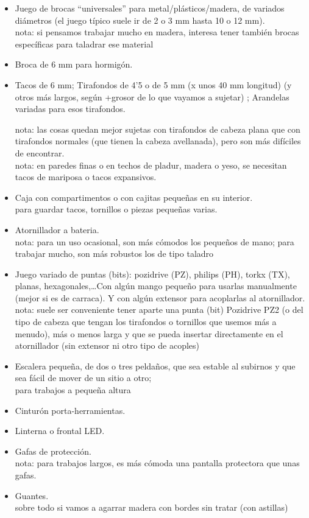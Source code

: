 \documentclass[spanish,10pt,a4paper,final,oneside]{article}
\begin{document}
\begin{itemize}
\item Juego de brocas ``universales'' para metal/plásticos/madera, de variados diámetros (el juego típico suele ir de 2 o 3 mm hasta 10 o 12 mm).
\\nota: si pensamos trabajar mucho en madera, interesa tener también brocas específicas para taladrar ese material

\item Broca de 6 mm para hormigón.

\item Tacos de 6 mm; Tirafondos de 4'5 o de 5 mm (x unos 40 mm longitud) (y otros más largos, según +grosor de lo que vayamos a sujetar) ; Arandelas variadas para esos tirafondos.

nota: las cosas quedan mejor sujetas con tirafondos de cabeza plana que con tirafondos normales (que tienen la cabeza avellanada), pero son más difíciles de encontrar.
\\nota: en paredes finas o en techos de pladur, madera o yeso, se necesitan tacos de mariposa o tacos expansivos.

\item Caja con compartimentos o con cajitas pequeñas en su interior.
\\para guardar tacos, tornillos o piezas pequeñas varias.

\item Atornillador a bateria.
\\nota: para un uso ocasional, son más cómodos los pequeños de mano; para trabajar mucho, son más robustos los de tipo taladro

\item Juego variado de puntas (bits): pozidrive (PZ), philips (PH), torkx (TX), planas, hexagonales,\ldots Con algún mango pequeño para usarlas manualmente (mejor si es de carraca). Y con algún extensor para acoplarlas al atornillador.
\\nota: suele ser conveniente tener aparte una punta (bit) Pozidrive PZ2 (o del tipo de cabeza que tengan los tirafondos o tornillos que usemos más a menudo), más o menos larga y que se pueda insertar directamente en el atornillador (sin extensor ni otro tipo de acoples)

\item Escalera pequeña, de dos o tres peldaños, que sea estable al subirnos y que sea fácil de mover de un sitio a otro;
\\para trabajos a pequeña altura

\item Cinturón porta-herramientas.

\item Linterna o frontal LED.

\item Gafas de protección.
\\nota: para trabajos largos, es más cómoda una pantalla protectora que unas gafas.

\item Guantes.
\\sobre todo si vamos a agarrar madera con bordes sin tratar (con astillas)

\end{itemize}
\end{document}
